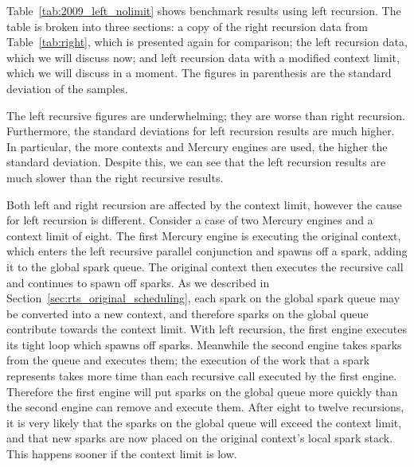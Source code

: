 Table~\ref{tab:2009_left_nolimit} shows benchmark results using left
recursion.
The table is broken into three sections:
a copy of the right recursion data from Table~\ref{tab:right},
which is presented again for comparison;
the left recursion data,
which we will discuss now;
and left recursion data with a modified context limit,
which we will discuss in a moment.
The figures in parenthesis are the standard deviation of the samples.

The left recursive figures are underwhelming;
they are worse than right recursion.
Furthermore,
the standard deviations for left recursion results are much
higher.
In particular,
the more contexts and Mercury engines are used,
the higher the standard deviation.
Despite this,
we can see that the left recursion results are much slower than the right
recursive results.

Both left and right recursion are affected by the context limit,
however the cause for left recursion is different.
Consider a case of two Mercury engines and a context limit of eight.
The first Mercury engine is executing the original context,
which enters the left recursive parallel conjunction and spawns off a spark,
adding it to the global spark queue.
The original context then executes the recursive call and
continues to spawn off sparks.
As we described in Section~\ref{sec:rts_original_scheduling},
each spark on the global spark queue may be converted into a new
context,
and therefore sparks on the global queue contribute towards the context
limit.
With left recursion,
the first engine executes its tight loop which spawns off sparks.
Meanwhile the second engine takes sparks from the queue and executes them;
the execution of the work that a spark represents takes more time than each
recursive call executed by the first engine.
Therefore the first engine will put sparks on the global queue more quickly
than the second engine can remove and execute them.
After eight to twelve recursions,
it is very likely that the sparks on the global queue will exceed the
context limit,
and that new sparks are now placed on the original context's local spark
stack.
This happens sooner if the context limit is low.

